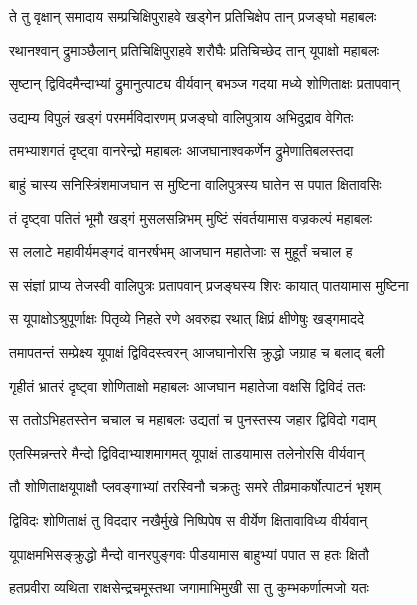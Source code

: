 \twolineshloka
{ते तु वृक्षान् समादाय सम्प्रचिक्षिपुराहवे}
{खड्गेन प्रतिचिक्षेप तान् प्रजङ्घो महाबलः} %

\twolineshloka
{रथानश्वान् द्रुमाञ्छैलान् प्रतिचिक्षिपुराहवे}
{शरौघैः प्रतिचिच्छेद तान् यूपाक्षो महाबलः} %

\twolineshloka
{सृष्टान् द्विविदमैन्दाभ्यां द्रुमानुत्पाट्य वीर्यवान्}
{बभञ्ज गदया मध्ये शोणिताक्षः प्रतापवान्} %

\twolineshloka
{उद्यम्य विपुलं खड्गं परमर्मविदारणम्}
{प्रजङ्घो वालिपुत्राय अभिदुद्राव वेगितः} %

\twolineshloka
{तमभ्याशगतं दृष्ट्वा वानरेन्द्रो महाबलः}
{आजघानाश्वकर्णेन द्रुमेणातिबलस्तदा} %

\twolineshloka
{बाहुं चास्य सनिस्त्रिंशमाजघान स मुष्टिना}
{वालिपुत्रस्य घातेन स पपात क्षितावसिः} %

\twolineshloka
{तं दृष्ट्वा पतितं भूमौ खड्गं मुसलसन्निभम्}
{मुष्टिं संवर्तयामास वज्रकल्पं महाबलः} %

\twolineshloka
{स ललाटे महावीर्यमङ्गदं वानरर्षभम्}
{आजघान महातेजाः स मुहूर्तं चचाल ह} %

\twolineshloka
{स संज्ञां प्राप्य तेजस्वी वालिपुत्रः प्रतापवान्}
{प्रजङ्घस्य शिरः कायात् पातयामास मुष्टिना} %

\twolineshloka
{स यूपाक्षोऽश्रुपूर्णाक्षः पितृव्ये निहते रणे}
{अवरुह्य रथात् क्षिप्रं क्षीणेषुः खड्गमाददे} %

\twolineshloka
{तमापतन्तं सम्प्रेक्ष्य यूपाक्षं द्विविदस्त्वरन्}
{आजघानोरसि क्रुद्धो जग्राह च बलाद् बली} %

\twolineshloka
{गृहीतं भ्रातरं दृष्ट्वा शोणिताक्षो महाबलः}
{आजघान महातेजा वक्षसि द्विविदं ततः} %

\twolineshloka
{स ततोऽभिहतस्तेन चचाल च महाबलः}
{उद्यतां च पुनस्तस्य जहार द्विविदो गदाम्} %

\twolineshloka
{एतस्मिन्नन्तरे मैन्दो द्विविदाभ्याशमागमत्}
{यूपाक्षं ताडयामास तलेनोरसि वीर्यवान्} %

\twolineshloka
{तौ शोणिताक्षयूपाक्षौ प्लवङ्गाभ्यां तरस्विनौ}
{चक्रतुः समरे तीव्रमाकर्षोत्पाटनं भृशम्} %

\twolineshloka
{द्विविदः शोणिताक्षं तु विददार नखैर्मुखे}
{निष्पिपेष स वीर्येण क्षितावाविध्य वीर्यवान्} %

\twolineshloka
{यूपाक्षमभिसङ्क्रुद्धो मैन्दो वानरपुङ्गवः}
{पीडयामास बाहुभ्यां पपात स हतः क्षितौ} %

\twolineshloka
{हतप्रवीरा व्यथिता राक्षसेन्द्रचमूस्तथा}
{जगामाभिमुखी सा तु कुम्भकर्णात्मजो यतः} %

